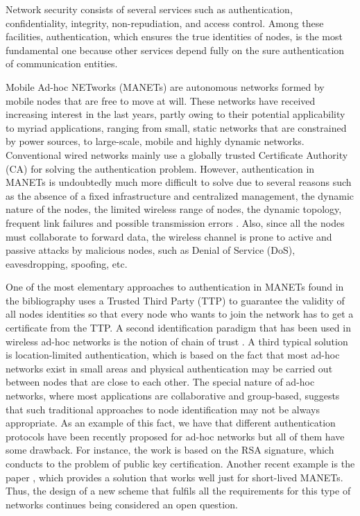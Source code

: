 \documentclass[conference]{IEEEtran}
\begin{document}
Network security consists of several services such as authentication, confidentiality, integrity, non-repudiation, and access control. Among these facilities, authentication, which ensures the true identities of nodes, is the most fundamental one because other services depend fully on the sure authentication of communication entities.

Mobile Ad-hoc NETworks (MANETs) are autonomous networks formed by mobile nodes that are free to move at will. These networks have received increasing interest in the last years, partly owing to their potential applicability to myriad applications, ranging from small, static networks that are constrained by power sources, to large-scale, mobile and highly dynamic networks.
Conventional wired networks mainly use a globally trusted
Certificate Authority (CA) for solving the authentication problem.
However, authentication in MANETs is undoubtedly much more
difficult to solve due to several reasons such as the absence of a
fixed infrastructure and centralized management, the dynamic
nature of the nodes, the limited wireless range of nodes, the
dynamic topology, frequent link failures and possible transmission
errors \cite{ATEDQ05} \cite{Wei04}. Also, since all the nodes must
collaborate to forward data, the wireless channel is prone to
active and passive attacks by malicious nodes, such as Denial of
Service (DoS), eavesdropping, spoofing, etc.

One of the most elementary approaches to authentication in MANETs
found in the bibliography uses a Trusted Third Party (TTP) to
guarantee the validity of all nodes identities so that every node
who wants to join the network has to get a certificate from the
TTP. A second identification paradigm that has been used in
wireless ad-hoc networks is the notion of  chain of trust
\cite{HBC01}. A third typical solution is location-limited
authentication, which is based on the fact that most ad-hoc
networks exist in small areas and physical authentication may be
carried out between nodes that are close to each other. The
special nature of ad-hoc networks, where most applications are
collaborative and group-based, suggests that such traditional
approaches to node identification may not be always appropriate.
As an example of this fact, we have that different authentication
protocols have been recently proposed for ad-hoc networks but all
of them have some drawback. For instance, the work \cite{HJYSCL}
is based on the RSA signature, which conducts to the problem of
public key certification. Another recent example is the paper
\cite{STY05}, which provides a solution that works well just for
short-lived MANETs. Thus, the design of a new
scheme that fulfils all the requirements for this type of networks
continues being considered an open question.
\end{document}
